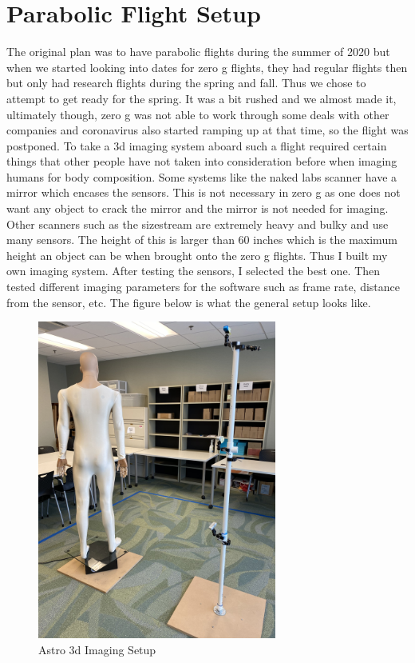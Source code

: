 \section{Parabolic Flight Setup}
The original plan was to have parabolic flights during the summer of 2020 but when we started looking into dates for zero g flights, they had regular flights then but only had research flights during the spring and fall. Thus we chose to attempt to get ready for the spring. It was a bit rushed and we almost made it, ultimately though, zero g was not able to work through some deals with other companies and coronavirus also started ramping up at that time, so the flight was postponed.
To take a 3d imaging system aboard such a flight required certain things that other people have not taken into consideration before when imaging humans for body composition. Some systems like the naked labs scanner have a mirror which encases the sensors. This is not necessary in zero g as one does not want any object to crack the mirror and the mirror is not needed for imaging. Other scanners such as the sizestream are extremely heavy and bulky and use many sensors. The height of this is larger than 60 inches which is the maximum height an object can be when brought onto the zero g flights. Thus I built my own imaging system. After testing the sensors, I selected the best one. Then tested different imaging parameters for the software such as frame rate, distance from the sensor, etc.
The figure below is what the general setup looks like.
\begin{figure}[h]
	\caption{Astro 3d Imaging Setup}
	\centering
	\includegraphics[width=0.7\textwidth, angle=-90]{images/astro_setup.jpg}
\end{figure}

